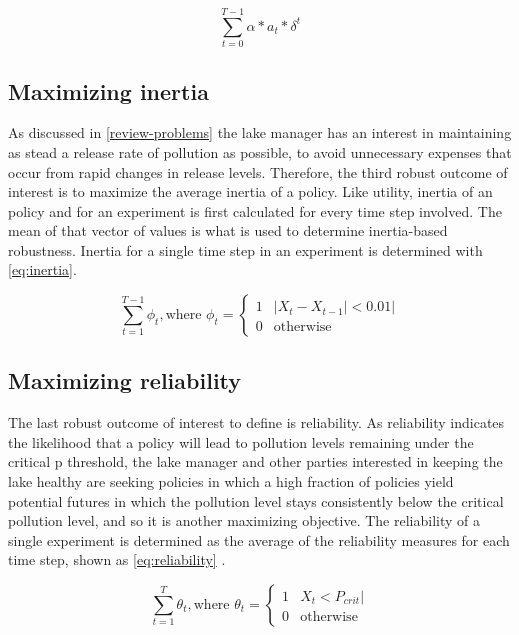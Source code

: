 \begin{equation}\label{eq:utility}
    \sum_{t=0}^{T-1}\alpha*a_{t}*\delta^{t}
\end{equation}

\subsection{Maximizing inertia}
As discussed in \cref{review-problems} the lake manager has an interest in maintaining as stead a release rate of pollution as possible, to avoid unnecessary expenses that occur from rapid changes in release levels. Therefore, the third robust outcome of interest is to maximize the average inertia of a policy. Like utility, inertia of an policy and for an experiment is first calculated for every time step involved. The mean of that vector of values is what is used to determine inertia-based robustness. Inertia for a single time step in an experiment is determined with \cref{eq:inertia}. 

\begin{equation}\label{eq:inertia}
    \sum_{t=1}^{T-1}\phi_{t}, \text{where } \phi_{t} = \begin{cases}
    1 & |X_{t}-X_{t-1}| < 0.01| \\
    0 & \text{otherwise}
    \end{cases}
\end{equation}

\subsection{Maximizing reliability}
The last robust outcome of interest to define is reliability. As reliability indicates the likelihood that a policy will lead to pollution levels remaining under the critical p threshold, the lake manager and other parties interested in keeping the lake healthy are seeking policies in which a high fraction of policies yield potential futures in which the pollution level stays consistently below the critical pollution level, and so it is another maximizing objective. The reliability of a single experiment is determined as the average of the reliability measures for each time step, shown as \cref{eq:reliability} \citep{Ward2015}.

\begin{equation}\label{eq:reliability}
\sum_{t=1}^{T}\theta_{t}, \text{where } \theta_{t} = \begin{cases}
1 & X_{t} < P_{crit} | \\
0 & \text{otherwise}
\end{cases}
\end{equation}